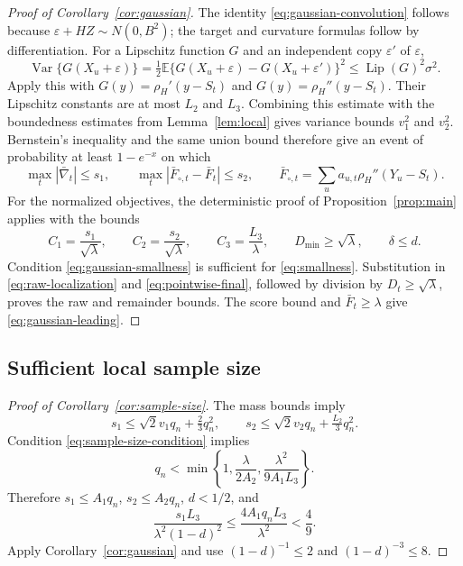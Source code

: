 \documentclass[11pt]{article}
\newcommand{\E}{\mathbb{E}}
\begin{document}
\begin{proof}[Proof of Corollary~\ref{cor:gaussian}]
The identity \eqref{eq:gaussian-convolution} follows because
\(\varepsilon+HZ\sim N(0,B^2)\); the target and curvature formulas follow by
differentiation.  For a Lipschitz function \(G\) and an independent copy
\(\varepsilon'\) of \(\varepsilon\),
\[
  \operatorname{Var}\{G(X_u+\varepsilon)\}
  =\tfrac12\E\{G(X_u+\varepsilon)-G(X_u+\varepsilon')\}^2
  \leq\operatorname{Lip}(G)^2\sigma^2.
\]
Apply this with \(G(y)=\rho_H'(y-S_t)\) and
\(G(y)=\rho_H''(y-S_t)\).  Their Lipschitz constants are at most \(L_2\)
and \(L_3\).  Combining this estimate with the boundedness estimates from
Lemma~\ref{lem:local} gives variance bounds \(v_1^2\) and \(v_2^2\).
Bernstein's inequality and the same union bound therefore give an event of
probability at least \(1-e^{-x}\) on which
\[
  \max_t|\bar\nabla_t|\leq s_1,\qquad
  \max_t|\bar F_{\circ,t}-\bar F_t|\leq s_2,
  \qquad
  \bar F_{\circ,t}=\sum_u a_{u,t}\rho_H''(Y_u-S_t).
\]
For the normalized objectives, the deterministic proof of
Proposition~\ref{prop:main} applies with the bounds
\[
  C_1=\frac{s_1}{\sqrt\lambda},\qquad
  C_2=\frac{s_2}{\sqrt\lambda},\qquad
  C_3=\frac{L_3}{\lambda},\qquad
  D_{\min}\geq\sqrt\lambda,\qquad\delta\leq d.
\]
Condition \eqref{eq:gaussian-smallness} is sufficient for
\eqref{eq:smallness}.  Substitution in \eqref{eq:raw-localization} and
\eqref{eq:pointwise-final}, followed by division by \(D_t\geq\sqrt\lambda\),
proves the raw and remainder bounds.  The score bound and
\(\bar F_t\geq\lambda\) give \eqref{eq:gaussian-leading}.
\end{proof}

\subsection{Sufficient local sample size}

\begin{proof}[Proof of Corollary~\ref{cor:sample-size}]
The mass bounds imply
\[
  s_1\leq\sqrt2v_1q_n+\tfrac23q_n^2,\qquad
  s_2\leq\sqrt2v_2q_n+\tfrac{L_2}{3}q_n^2.
\]
Condition \eqref{eq:sample-size-condition} implies
\[
  q_n<\min\left\{1,\frac{\lambda}{2A_2},
                    \frac{\lambda^2}{9A_1L_3}\right\}.
\]
Therefore \(s_1\leq A_1q_n\), \(s_2\leq A_2q_n\), \(d<1/2\), and
\[
  \frac{s_1L_3}{\lambda^2(1-d)^2}
  \leq\frac{4A_1q_nL_3}{\lambda^2}<\frac49.
\]
Apply Corollary~\ref{cor:gaussian} and use
\((1-d)^{-1}\leq2\) and \((1-d)^{-3}\leq8\).
\end{proof}
\end{document}
